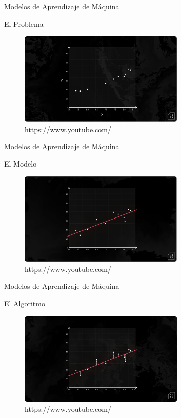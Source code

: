 \documentclass{beamer}
\begin{document}
	

\begin{frame}{Modelos de Aprendizaje de Máquina}
\begin{block}{El Problema}
	\begin{figure}
		\includegraphics[width=0.7\textwidth]{modelo-algoritmo_1}
		\caption{https://www.youtube.com/}
		\centering
	\end{figure}
\end{block}
		
\end{frame}
	
\begin{frame}{Modelos de Aprendizaje de Máquina}
\begin{block}{El Modelo}
	\begin{figure}
		\includegraphics[width=0.7\textwidth]{modelo-algoritmo_2}
		\caption{https://www.youtube.com/}
		\centering
	\end{figure}
\end{block}
		
\end{frame}
	
\begin{frame}{Modelos de Aprendizaje de Máquina}
\begin{block}{El Algoritmo}
	\begin{figure}
		\includegraphics[width=0.7\textwidth]{modelo-algoritmo_3}
		\caption{https://www.youtube.com/}
		\centering
	\end{figure}
\end{block}

\end{frame}
\end{document}

